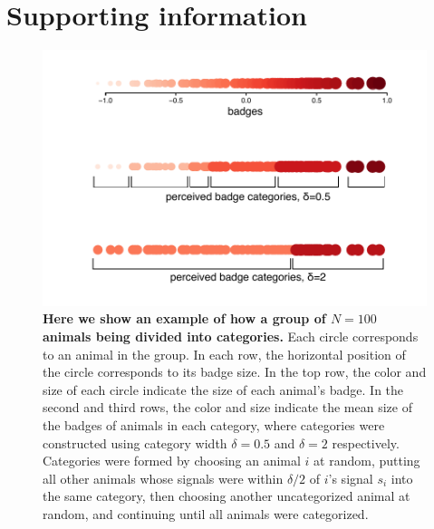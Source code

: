 \clearpage{}
\renewcommand{\thesection}{}
\section{Supporting information}
\renewcommand{\thesection}{S}
\renewcommand{\thesubsection}{S\arabic{subsection}}
\renewcommand{\theequation}{S\arabic{equation}}
\renewcommand{\thetable}{S\arabic{table}}
\renewcommand{\thefigure}{S\arabic{figure}}
\setcounter{equation}{0}  
\setcounter{figure}{0}
\setcounter{table}{0}

\begin{figure}[ht]
\includegraphics[width=.8\textwidth]{figures/categories.pdf}
\caption{\sffamily\small\textbf{Here we show an example of how a group of $N=100$ animals being divided into categories.} 
Each circle corresponds to an animal in the group. In each row, the horizontal position of the circle corresponds to its badge size. In the top row, the color and size of each circle indicate the size of each animal's badge. In the second and third rows, the color and size indicate the mean size of the badges of animals in each category, where categories were constructed using category width $\delta=0.5$ and $\delta=2$ respectively. Categories were formed by choosing an animal $i$ at random, putting all other animals whose signals were within $\delta/2$ of $i$'s signal $s_i$ into the same category, then choosing another uncategorized animal at random, and continuing until all animals were categorized.}
 \label{cats_ex}
\end{figure}

